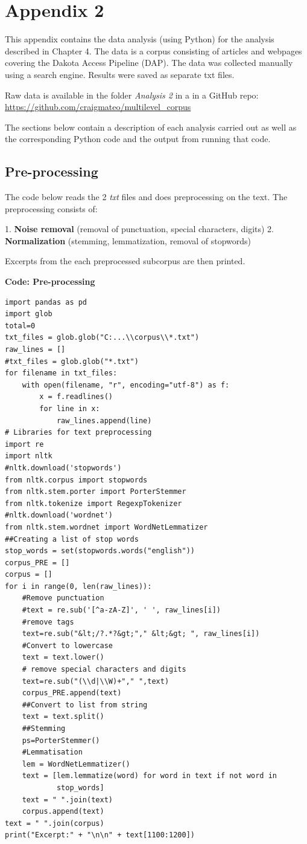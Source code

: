 \chapter{Appendix 2}
This appendix contains the data analysis (using Python) for the analysis described in Chapter 4. The data is a corpus consisting of articles and webpages covering the Dakota Access Pipeline (DAP). The data was collected manually using a search engine. Results were saved as separate txt files. 

Raw data is available in the folder \textit{Analysis 2} in a in a GitHub repo: \href{https://github.com/craigmateo/multilevel_corpus}{https://github.com/craigmateo/multilevel\_corpus}

The sections below contain a description of each analysis carried out as well as the corresponding Python code and the output from running that code. 

\section{Pre-processing}

The code below reads the 2 \textit{txt} files and does preprocessing on the text. The preprocessing consists of:

1. \textbf{Noise removal} (removal of punctuation, special characters, digits)
2. \textbf{Normalization} (stemming, lemmatization, removal of stopwords) 

Excerpts from the each preprocessed subcorpus are then printed.

\textbf{Code: Pre-processing}

\begin{lstlisting}
import pandas as pd
import glob
total=0
txt_files = glob.glob("C:...\\corpus\\*.txt")
raw_lines = []
#txt_files = glob.glob("*.txt")
for filename in txt_files:
	with open(filename, "r", encoding="utf-8") as f:
		x = f.readlines()
		for line in x:
			raw_lines.append(line)
# Libraries for text preprocessing
import re
import nltk
#nltk.download('stopwords')
from nltk.corpus import stopwords
from nltk.stem.porter import PorterStemmer
from nltk.tokenize import RegexpTokenizer
#nltk.download('wordnet') 
from nltk.stem.wordnet import WordNetLemmatizer
##Creating a list of stop words
stop_words = set(stopwords.words("english"))
corpus_PRE = []
corpus = []
for i in range(0, len(raw_lines)):
    #Remove punctuation
    #text = re.sub('[^a-zA-Z]', ' ', raw_lines[i])
    #remove tags
    text=re.sub("&lt;/?.*?&gt;"," &lt;&gt; ", raw_lines[i])
    #Convert to lowercase
    text = text.lower()
    # remove special characters and digits
    text=re.sub("(\\d|\\W)+"," ",text)
    corpus_PRE.append(text)
    ##Convert to list from string
    text = text.split()
    ##Stemming
    ps=PorterStemmer()
    #Lemmatisation
    lem = WordNetLemmatizer()
    text = [lem.lemmatize(word) for word in text if not word in  
            stop_words] 
    text = " ".join(text)
    corpus.append(text)
text = " ".join(corpus)
print("Excerpt:" + "\n\n" + text[1100:1200])
\end{lstlisting}


